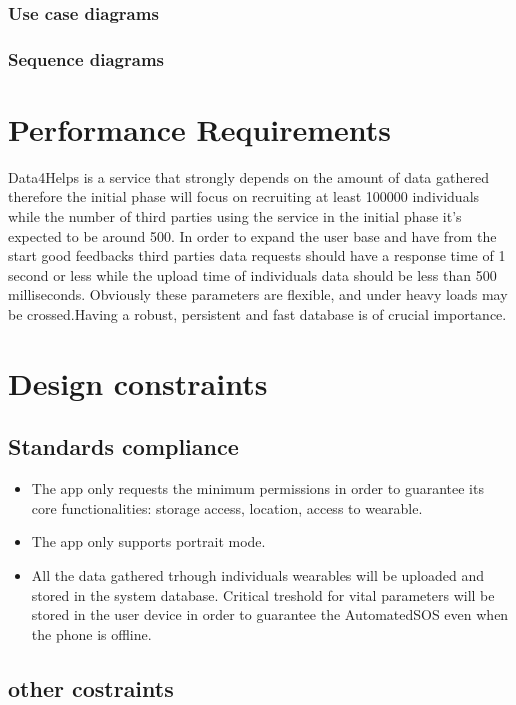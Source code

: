 \subsubsection{Use case diagrams}


\subsubsection{Sequence diagrams}

\section{Performance Requirements}
Data4Helps is a service that strongly depends on the amount of data gathered therefore the initial phase will focus on recruiting at least 100000 individuals while the number of third parties using the service in the initial phase it's expected to be around 500. In order to expand the user base and have from the start good feedbacks third parties data requests should have a response time of 1 second or less while the upload time of individuals data should be less than 500 milliseconds. Obviously these parameters are flexible, and under heavy loads may be crossed.Having a robust, persistent and fast database is of crucial importance.

\section{Design constraints}
\subsection{Standards compliance}
\begin{itemize}
\item The app only requests the minimum permissions in order to guarantee its core functionalities: storage access, location, access to wearable.
\item The app only supports portrait mode.
\item All the data gathered trhough individuals wearables will be uploaded and stored in the system database.
Critical treshold for vital parameters will be stored in the user device in order to guarantee the AutomatedSOS even when the phone is offline.
\end{itemize}


\subsection{other costraints}

